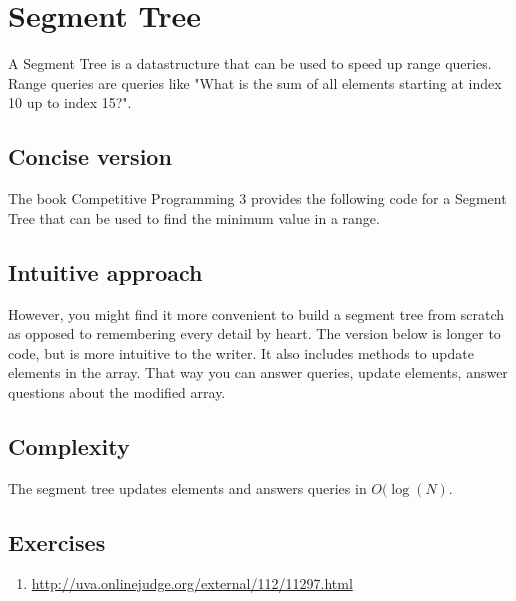 \section{Segment Tree}
A Segment Tree is a datastructure that can be used to speed up range queries. Range queries are queries like "What is the sum of all elements starting at index 10 up to index 15?".

\subsection{Concise version}
The book Competitive Programming 3 provides the following code for a Segment Tree that can be used to find the minimum value in a range.



\subsection{Intuitive approach}
However, you might find it more convenient to build a segment tree from scratch as opposed to remembering every detail by heart. The version below is longer to code, but is more intuitive to the writer. It also includes methods to update elements in the array. That way you can answer queries, update elements, answer questions about the modified array.



\subsection{Complexity}
The segment tree updates elements and answers queries in $O(\log{\left(N\right)}$.

\subsection{Exercises}
\begin{enumerate}
\item \url{http://uva.onlinejudge.org/external/112/11297.html}

\end{enumerate}